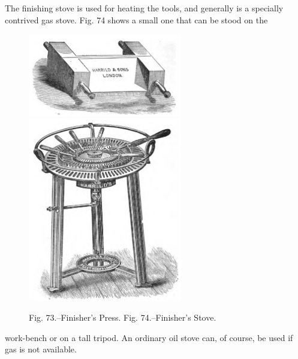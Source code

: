\documentclass[twoside]{book}
\begin{document}
The finishing stove is used for heating the tools,
and generally is a specially contrived gas stove.
Fig. 74 shows a small one that can be stood on the
\pagebreak
	\vspace*{\fill}
	\begin{figure}[h]
		\centering
		\includegraphics[width=0.6\textwidth]{Figures/_073.png}
		\includegraphics[width=0.6\textwidth]{Figures/_074.png}
		\caption*{
			Fig. 73.--Finisher's Press.
			Fig. 74.--Finisher's Stove.
         }
	\end{figure}
	\vspace*{\fill}
\pagebreak
work-bench or on a tall tripod. An ordinary oil
stove can, of course, be used if gas is not available.
\end{document}
